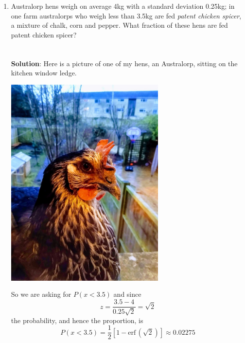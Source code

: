 \documentclass[11pt,a4paper]{scrartcl}
\begin{document}
\begin{enumerate}
\item Australorp hens weigh on average 4kg with a standard deviation
  0.25kg; in one farm australorps who weigh less than 3.5kg are fed
  \textsl{patent chicken spicer}, a mixture of chalk, corn and
  pepper. What fraction of these hens are fed patent chicken spicer?
  \\ \\ \\ \textbf{Solution}: Here is a picture of one of my hens, an Australorp, sitting on the kitchen window ledge.
  \begin{center}
    \includegraphics[width=8cm]{hen.jpg}
  \end{center}
  So we are asking for $P(x<3.5)$ and since
  $$z=\frac{3.5-4}{0.25\sqrt{2}}=\sqrt{2}$$
    the probability, and hence the proportion, is
    $$P(x<3.5)=\frac{1}{2}[1-\mbox{erf}\,(\sqrt{2})]\approx 0.02275$$


\end{enumerate}
\end{document}
